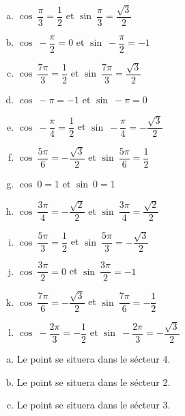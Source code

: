 \documentclass[12pt, a4paper]{article}
\begin{document}
\begin{Exercise}[number={59}]
    \begin{enumerate}[a)]
        \item $\cos{\ \dfrac{\pi}{3}}=\dfrac{1}{2}$ \quad et \quad $\sin{\ \dfrac{\pi}{3}}=\dfrac{\sqrt{3}}{2}$
        \item $\cos{\ -\dfrac{\pi}{2}}=0$ \quad et \quad $\sin{\ -\dfrac{\pi}{2}}=-1$
        \item $\cos{\ \dfrac{7\pi}{3}}=\dfrac{1}{2}$ \quad et \quad $\sin{\ \dfrac{7\pi}{3}}=\dfrac{\sqrt{3}}{2}$
        \item $\cos{\ -\pi}=-1$ \quad et \quad $\sin{\ -\pi}=0$
        \item $\cos{\ -\dfrac{\pi}{4}}=\dfrac{1}{2}$ \quad et \quad $\sin{\ -\dfrac{\pi}{4}}=-\dfrac{\sqrt{3}}{2}$
        \item $\cos{\ \dfrac{5\pi}{6}}=-\dfrac{\sqrt{3}}{2}$ \quad et \quad $\sin{\ \dfrac{5\pi}{6}}=\dfrac{1}{2}$
        \item $\cos{\ 0}=1$ \quad et \quad $\sin{\ 0}=1$
        \item $\cos{\ \dfrac{3\pi}{4}}=-\dfrac{\sqrt{2}}{2}$ \quad et \quad $\sin{\ \dfrac{3\pi}{4}}=\dfrac{\sqrt{2}}{2}$
        \item $\cos{\ \dfrac{5\pi}{3}}=\dfrac{1}{2}$ \quad et \quad $\sin{\ \dfrac{5\pi}{3}}=-\dfrac{\sqrt{3}}{2}$
        \item $\cos{\ \dfrac{3\pi}{2}}=0$ \quad et \quad $\sin{\ \dfrac{3\pi}{2}}=-1$
        \item $\cos{\ \dfrac{7\pi}{6}}=-\dfrac{\sqrt{3}}{2}$ \quad et \quad $\sin{\ \dfrac{7\pi}{6}}=-\dfrac{1}{2}$
        \item $\cos{\ -\dfrac{2\pi}{3}}=-\dfrac{1}{2}$ \quad et \quad $\sin{\ -\dfrac{2\pi}{3}}=-\dfrac{\sqrt{3}}{2}$
    \end{enumerate}
\end{Exercise}

\begin{Exercise}[number={60}]
    \begin{enumerate}[a)]
        \item Le point se situera dans le sécteur 4.
        \item Le point se situera dans le sécteur 2.
        \item Le point se situera dans le sécteur 3.
    \end{enumerate}
\end{Exercise}
\end{document}
